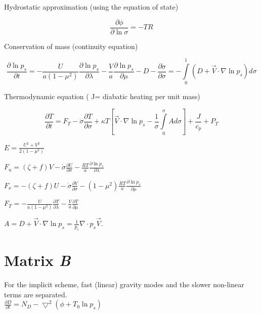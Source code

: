 Hydrostatic approximation (using the equation of state)

\begin{equation}
{\displaystyle \frac{\partial \phi}{\partial \ln \sigma} = - TR} 
\end{equation}

Conservation of mass (continuity equation)

\begin{equation}
{\displaystyle \frac{\partial \ln p_s}{\partial t} = - \frac{U}{a (1 - \mu^2)} \frac{\partial \ln p_s}{\partial \lambda} - \frac{V}{a} \frac{\partial \ln p_s}{\partial \mu} - D - \frac{\partial \dot{\sigma}}{\partial \sigma}
= - \int\limits_{0}^{1} (D+\vec{V} \cdot \nabla \ln p_s) d \sigma}
\end{equation}

Thermodynamic equation ( J= diabatic heating per unit mass)

\begin{equation}
{\displaystyle \frac{\partial T}{\partial t} = F_T  - \dot{\sigma} \frac{\partial T}{\partial \sigma} + \kappa T [\vec{V} \cdot  \nabla \ln p_s - \frac{1}{\sigma}\int\limits_{0}^{\sigma} A d \sigma] +\frac{J}{c_p} + P_T}
\end{equation}



${\displaystyle E = \frac{U^2 + V^2}{2(1 - \mu^2)} }$

${\displaystyle F_u = ( \zeta + f ) V - \dot{\sigma} \frac{\partial U}{\partial \sigma} - \frac{RT}{a} \frac{\partial \ln p_s}{\partial \lambda}}  $

${\displaystyle F_\nu = - (\zeta + f)U - \dot{\sigma} \frac{\partial V}{\partial\sigma} - (1 - \mu^2) \frac{RT}{a} \frac{\partial \ln p_s}{\partial \mu}} $

${\displaystyle F_T =  - \frac{U}{a(1-\mu^2)} \frac{\partial T}{\partial \lambda} - \frac{V}{a} \frac{\partial T}{\partial \mu} } $

$A=D+\vec{V} \cdot \nabla \ln p_s 
= \frac{1}{p_s} \nabla \cdot  p_s  \vec{V}$.


\section{Matrix {\em B}}


For the implicit scheme, fast (linear) gravity modes and
the slower non-linear terms are separated. \\

${\displaystyle\frac{ \partial  D }{\partial t}= 
{ N_D} - \bigtriangledown^2 (\phi + T_0 \ln p_s)} $\\

